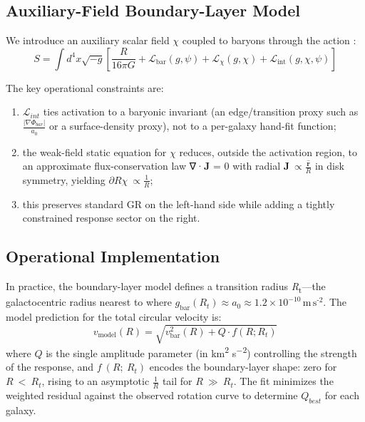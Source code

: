 \documentclass[11pt]{article}
\begin{document}
\subsection{Auxiliary-Field Boundary-Layer Model}\label{auxiliary-field-boundary-layer-model}

We introduce an auxiliary scalar field \(\chi\) coupled to baryons through the action \citep{Burgess2004, Donoghue1994}:
\begin{equation}
S = \int d^{4}x\sqrt{-g}\left[ \frac{R}{16\pi G} + \mathcal{L}_{\text{bar}}(g,\psi) + \mathcal{L}_{\chi}(g,\chi) + \mathcal{L}_{\text{int}}(g,\chi,\psi) \right]
\label{eq:action-principle}
\end{equation}

The key operational constraints are:

\begin{enumerate}
\def\labelenumi{(\roman{enumi})}
\item
  \(\mathcal{L}_{int}\) ties activation to a baryonic invariant (an edge/transition proxy such as \(\frac{\left| \nabla\Phi_{bar} \right|}{a_{0}}\) or a surface-density proxy), not to a per-galaxy hand-fit function;
\item
  the weak-field static equation for \(\chi\) reduces, outside the activation region, to an approximate flux-conservation law \citep{BenderOrszag1999, KevorkianCole1996} ∇·\textbf{J} = 0 with radial \(\mathbf{J}\  \propto \frac{\widehat{\mathbf{r}}}{R}\) in disk symmetry, yielding \(\partial R\chi\  \propto \frac{1}{R}\);
\item
  this preserves standard GR on the left-hand side while adding a tightly constrained response sector on the right.
\end{enumerate}

\subsection{Operational Implementation}\label{operational-implementation}

In practice, the boundary-layer model defines a transition radius \emph{R}\textsubscript{t}---the galactocentric radius nearest to where \(g_{\text{bar}}\left( R_{t} \right) \approx a_{0} \approx 1.2 \times 10^{- 10}\,\text{m}\,\text{s}^{\text{-2}}\). The model prediction for the total circular velocity is:
\begin{equation}
v_{\text{model}}(R) = \sqrt{v_{\text{bar}}^{2}(R) + Q \cdot f(R; R_{t})}
\label{eq:boundary-layer-velocity}
\end{equation}
where \(Q\) is the single amplitude parameter (in km\textsuperscript{2} s\textsuperscript{−2}) controlling the strength of the response, and \(f\ (R;\ R_{t})\) encodes the boundary-layer shape: zero for \(R\  < \ R_{t}\), rising to an asymptotic \(\frac{1}{R}\) tail for \(R\  \gg \ R_{t}\). The fit minimizes the weighted residual against the observed rotation curve to determine \(Q_{best}\) for each galaxy.
\end{document}
